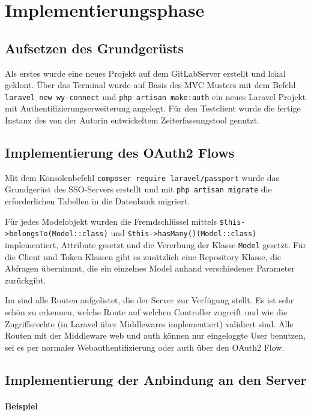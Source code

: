 \section{Implementierungsphase} 
\label{sec:Implementierungsphase}

\subsection{Aufsetzen des Grundgerüsts}
\label{sec:AufsetzenGrundgeruest}

Als erstes wurde eine neues Projekt auf dem GitLabServer erstellt und lokal geklont. Über das Terminal wurde auf Basis des MVC Musters mit dem Befehl \texttt{laravel new wy-connect} und \texttt{php artisan make:auth} ein neues Laravel Projekt mit Authentifizierungserweiterung angelegt. 
Für den Testclient wurde die fertige Instanz des von der Autorin entwickeltem Zeiterfassungstool genutzt.

\subsection{Implementierung des OAuth2 Flows}
\label{sec:ImplementierungOAuth2}

Mit dem Konsolenbefehl \texttt{composer require laravel/passport} wurde das Grundgerüst des SSO-Servers erstellt und mit \texttt{php artisan migrate} die erforderlichen Tabellen in die Datenbank migriert. 

Für jedes Modelobjekt wurden die Fremdschlüssel mittels \texttt{\$this->belongsTo(Model::class)} und \texttt{\$this->hasMany()(Model::class)} implementiert, Attribute gesetzt und die Vererbung der Klasse \texttt{Model} gesetzt.
Für die Client und Token Klassen gibt es zusätzlich eine Repository Klasse, die Abfragen übernimmt, die ein einzelnes Model anhand verschiedener Parameter zurückgibt. 

Im  sind alle Routen aufgelistet, die der Server zur Verfügung stellt. Es ist sehr schön zu erkennen, welche Route auf welchen Controller zugreift und wie die Zugriffsrechte (in Laravel über Middlewares implementiert) validiert sind. Alle Routen mit der Middleware web und auth können nur eingeloggte User benutzen, sei es per normaler Webauthentifizierung oder auth über den OAuth2 Flow.




\subsection{Implementierung der Anbindung an den Server}
\label{sec:ImplementierungCient}


\paragraph{Beispiel}



